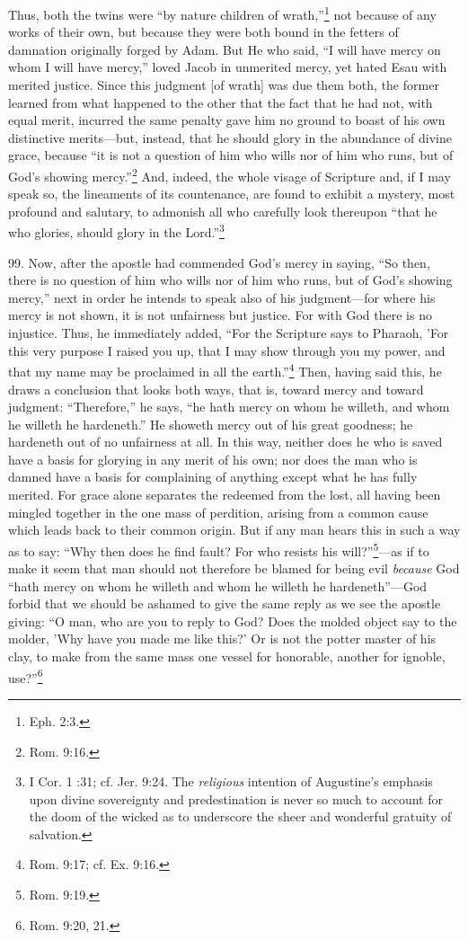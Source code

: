 Thus, both the twins were ``by nature children of wrath,''\footnote{Eph. 2:3.} not because of any works of their own, but because they were both bound in the fetters of damnation originally forged by Adam. But He who said, ``I will have mercy on whom I will have mercy,'' loved Jacob in unmerited mercy, yet hated Esau with merited justice. Since this judgment [of wrath] was due them both, the former learned from what happened to the other that the fact that he had not, with equal merit, incurred the same penalty gave him no ground to boast of his own distinctive merits—but, instead, that he should glory in the abundance of divine grace, because ``it is not a question of him who wills nor of him who runs, but of God's showing mercy.''\footnote{Rom. 9:16.} And, indeed, the whole visage of Scripture and, if I may speak so, the lineaments of its countenance, are found to exhibit a mystery, most profound and salutary, to admonish all who carefully look thereupon ``that he who glories, should glory in the Lord.''\footnote{I Cor. 1 :31; cf. Jer. 9:24. The \emph{religious} intention of Augustine's emphasis upon divine sovereignty and predestination is never so much to account for the doom of the wicked as to underscore the sheer and wonderful gratuity of salvation.}

99. Now, after the apostle had commended God's mercy in saying, ``So then, there is no question of him who wills nor of him who runs, but of God's showing mercy,'' next in order he intends to speak also of his judgment—for where his mercy is not shown, it is not unfairness but justice. For with God there is no injustice. Thus, he immediately added, ``For the Scripture says to Pharaoh, 'For this very purpose I raised you up, that I may show through you my power, and that my name may be proclaimed in all the earth.''\footnote{Rom. 9:17; cf. Ex. 9:16.} Then, having said this, he draws a conclusion that looks both ways, that is, toward mercy and toward judgment: ``Therefore,'' he says, ``he hath mercy on whom he willeth, and whom he willeth he hardeneth.'' He showeth mercy out of his great goodness; he hardeneth out of no unfairness at all. In this way, neither does he who is saved have a basis for glorying in any merit of his own; nor does the man who is damned have a basis for complaining of anything except what he has fully merited. For grace alone separates the redeemed from the lost, all having been mingled together in the one mass of perdition, arising from a common cause which leads back to their common origin. But if any man hears this in such a way as to say: ``Why then does he find fault? For who resists his will?''\footnote{Rom. 9:19.}—as if to make it seem that man should not therefore be blamed for being evil \emph{because} God ``hath mercy on whom he willeth and whom he willeth he hardeneth''—God forbid that we should be ashamed to give the same reply as we see the apostle giving: ``O man, who are you to reply to God? Does the molded object say to the molder, 'Why have you made me like this?' Or is not the potter master of his clay, to make from the same mass one vessel for honorable, another for ignoble, use?''\footnote{Rom. 9:20, 21.}

